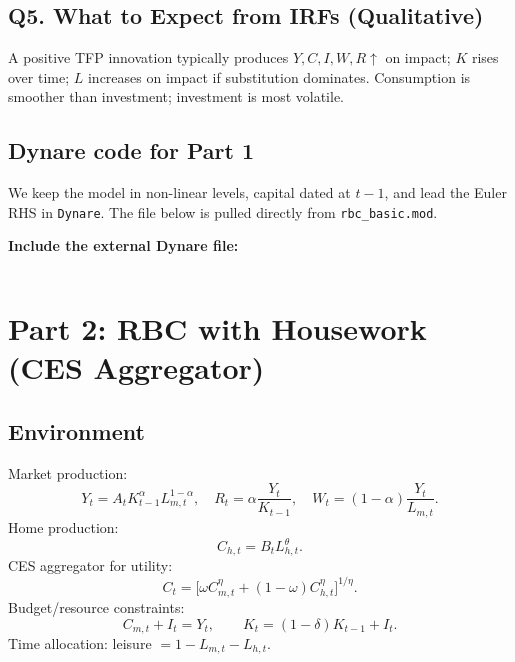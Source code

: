 \documentclass[a4paper,12pt]{article}
\theoremstyle{nonitalic}
\begin{document}
\subsection{Q5. What to Expect from IRFs (Qualitative)}
A positive TFP innovation typically produces $Y,C,I,W,R\uparrow$ on impact; $K$ rises over time; $L$ increases on impact if substitution dominates.
Consumption is smoother than investment; investment is most volatile.

\subsection{Dynare code for Part 1}
We keep the model in non-linear levels, capital dated at $t\!-\!1$, and lead the Euler RHS in \texttt{Dynare}.
The file below is pulled directly from \texttt{rbc\_basic.mod}.
\medskip

\noindent\textbf{Include the external Dynare file:}
\begin{lstlisting}[language=Dynare,caption={\texttt{rbc\_basic.mod}},label={lst:rbc_basic}]

\end{lstlisting}

\section{Part 2: RBC with Housework (CES Aggregator)}
\subsection{Environment}
Market production:
\begin{equation}
Y_t=A_t K_{t-1}^{\alpha} L_{m,t}^{1-\alpha},\quad 
R_t=\alpha \frac{Y_t}{K_{t-1}},\quad W_t=(1-\alpha)\frac{Y_t}{L_{m,t}}.
\end{equation}
Home production:
\begin{equation}
C_{h,t}=B_t L_{h,t}^{\theta}.
\end{equation}
CES aggregator for utility:
\begin{equation}
C_t=\Big[\omega C_{m,t}^{\eta}+(1-\omega)C_{h,t}^{\eta}\Big]^{1/\eta}.
\end{equation}
Budget/resource constraints:
\begin{equation}
C_{m,t}+I_t=Y_t,\qquad K_t=(1-\delta)K_{t-1}+I_t.
\end{equation}
Time allocation: leisure $=1-L_{m,t}-L_{h,t}$.
\end{document}
